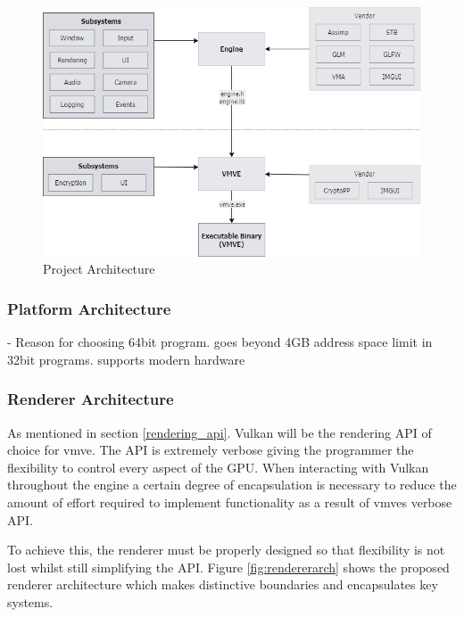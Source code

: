\documentclass[11pt]{article}
\begin{document}
\begin{figure}[H]
  \centering
  \includegraphics[width=\textwidth]{images/project_architecture.png}
  \caption{Project Architecture}
  \label{fig:projarch}
\end{figure}

\subsubsection{Platform Architecture}
- Reason for choosing 64bit program.
    goes beyond 4GB address space limit in 32bit programs.
    supports modern hardware



\subsubsection{Renderer Architecture}

As mentioned in section \ref{rendering_api}. Vulkan will be the rendering API of choice
for \gls*{vmve}. The API is extremely verbose giving the programmer the flexibility to
control every aspect of the GPU. When interacting with Vulkan throughout the engine
a certain degree of encapsulation is necessary to reduce the amount of effort required to 
implement functionality as a result of \glspl*{vmve} verbose API.

To achieve this, the renderer must be properly designed so that flexibility is not lost
whilst still simplifying the API. Figure \ref{fig:rendererarch} shows the proposed renderer
architecture which makes distinctive boundaries and encapsulates key systems.
\end{document}
